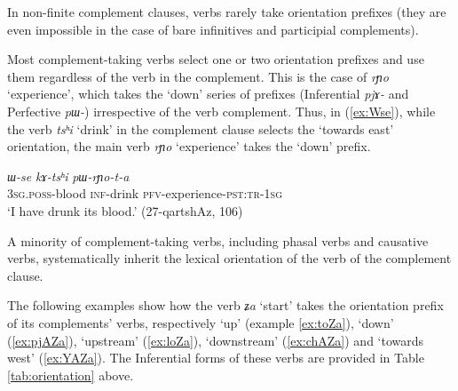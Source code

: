 \documentclass[oneside,a4paper,11pt]{article}
\newcommand{\ipa}[1]{\textit{\phon#1}}
\newcommand{\jpg}[2]{\ipa{#1} `#2'}
\newcommand{\refb}[1]{(\ref{#1})}
\begin{document}
In non-finite complement clauses, verbs rarely take orientation prefixes (they are even impossible in the case of bare infinitives and participial complements).

Most complement-taking verbs select one or two orientation prefixes and use them regardless of the verb in the complement. This is the case of  \jpg{rɲo}{experience}, which takes the `down' series of prefixes (Inferential \ipa{pjɤ-} and Perfective \ipa{pɯ-}) irrespective of the verb complement. Thus, in \refb{ex:Wse}, while the verb  \jpg{tsʰi}{drink} in the complement clause selects the `towards east' orientation, the main verb \jpg{rɲo}{experience} takes the `down' prefix.


\begin{exe}
\ex \label{ex:Wse}
\gll
\ipa{ɯ-se} 	\ipa{kɤ-tsʰi} 	\ipa{pɯ-rɲo-t-a} \\
\textsc{3sg.poss}-blood \textsc{inf}-drink \textsc{pfv}-experience-\textsc{pst:tr-1sg} \\
\glt `I have drunk its blood.' (27-qartshAz, 106)
\end{exe}

A minority of complement-taking verbs, including phasal verbs and causative verbs, systematically inherit the lexical orientation of the verb of the complement clause. 

The following examples show how the verb \jpg{ʑa}{start} takes the orientation prefix of its complements' verbs, respectively `up' (example \ref{ex:toZa}), `down' \refb{ex:pjAZa}, `upstream' \refb{ex:loZa}, `downstream' \refb{ex:chAZa} and `towards west' \refb{ex:YAZa}. The Inferential forms of these verbs are provided in Table \ref{tab:orientation} above.
\end{document}

